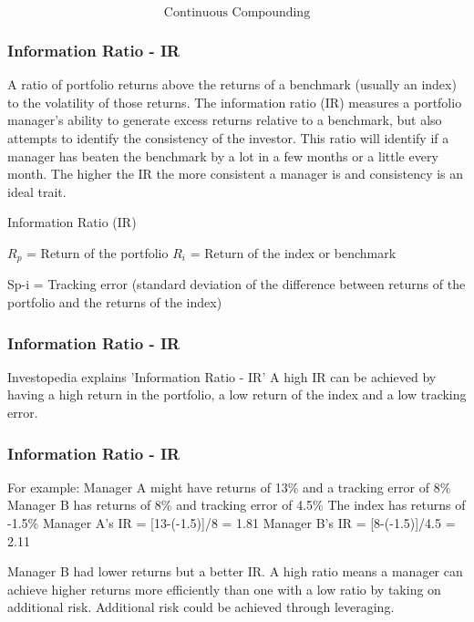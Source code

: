 \documentclass{beamer}
\begin{document}
\begin{frame}
\Large
\[
\mbox{Continuous Compounding}
\]
\end{frame}


\begin{frame}
\frametitle{Information Ratio - IR}
A ratio of portfolio returns above the returns of a benchmark (usually an index) to the volatility of those returns. 
The information ratio (IR) measures a portfolio manager's ability to generate excess returns relative to a benchmark, but also attempts to identify the consistency of the investor. This ratio will identify if a manager has beaten the benchmark by a lot in a few months or a little every month. The higher the IR the more consistent a manager is and consistency is an ideal trait.


Information Ratio (IR)

\begin{itemize}
$R_p$ = Return of the portfolio
$R_i$ = Return of the index or benchmark
\end{itemize}

Sp-i = Tracking error (standard deviation of the difference between returns of the portfolio and the returns of the index)  
\end{frame}


\begin{frame}
\frametitle{Information Ratio - IR}
Investopedia explains 'Information Ratio - IR'
A high IR can be achieved by having a high return in the portfolio, a low return of the index and a low tracking error. 
\end{frame}


\begin{frame}
\frametitle{Information Ratio - IR}
For example: 
Manager A might have returns of 13\% and a tracking error of 8\% 
Manager B has returns of 8\% and tracking error of 4.5\%
The index has returns of -1.5\%
Manager A's IR = [13-(-1.5)]/8 = 1.81
Manager B's IR = [8-(-1.5)]/4.5 = 2.11

Manager B had lower returns but a better IR. A high ratio means a manager can achieve higher returns more efficiently than one with a low ratio by taking on additional risk. Additional risk could be achieved through leveraging.  
\end{frame}
\end{document}
